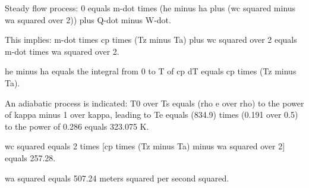 Steady flow process:
0 equals m-dot times (he minus ha plus (wc squared minus wa squared over 2)) plus Q-dot minus W-dot.

This implies:
m-dot times cp times (Tz minus Ta) plus wc squared over 2 equals m-dot times wa squared over 2.

he minus ha equals the integral from 0 to T of cp dT equals cp times (Tz minus Ta).

An adiabatic process is indicated:
T0 over Ts equals (rho e over rho) to the power of kappa minus 1 over kappa, leading to Te equals (834.9) times (0.191 over 0.5) to the power of 0.286 equals 323.075 K.

wc squared equals 2 times [cp times (Tz minus Ta) minus wa squared over 2] equals 257.28.

wa squared equals 507.24 meters squared per second squared.